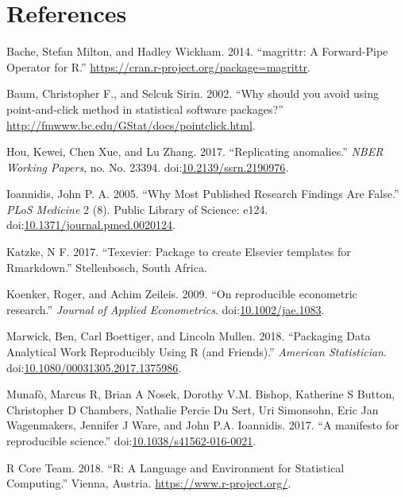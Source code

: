 \documentclass[11pt,preprint, authoryear]{elsarticle}
\numberwithin{equation}{section}
\numberwithin{figure}{section}
\numberwithin{table}{section}
\begin{document}
\section*{References}\label{references}

\hypertarget{refs}{}
\hypertarget{ref-Bache2014}{}
Bache, Stefan Milton, and Hadley Wickham. 2014. ``magrittr: A
Forward-Pipe Operator for R.''
\url{https://cran.r-project.org/package=magrittr}.

\hypertarget{ref-Baum2002}{}
Baum, Christopher F., and Selcuk Sirin. 2002. ``Why should you avoid
using point-and-click method in statistical software packages?''
\url{http://fmwww.bc.edu/GStat/docs/pointclick.html}.

\hypertarget{ref-Hou2017}{}
Hou, Kewei, Chen Xue, and Lu Zhang. 2017. ``Replicating anomalies.''
\emph{NBER Working Papers}, no. No. 23394.
doi:\href{https://doi.org/10.2139/ssrn.2190976}{10.2139/ssrn.2190976}.

\hypertarget{ref-Ioannidis2005}{}
Ioannidis, John P. A. 2005. ``Why Most Published Research Findings Are
False.'' \emph{PLoS Medicine} 2 (8). Public Library of Science: e124.
doi:\href{https://doi.org/10.1371/journal.pmed.0020124}{10.1371/journal.pmed.0020124}.

\hypertarget{ref-Katzke2017}{}
Katzke, N F. 2017. ``Texevier: Package to create Elsevier templates for
Rmarkdown.'' Stellenbosch, South Africa.

\hypertarget{ref-Koenker2009}{}
Koenker, Roger, and Achim Zeileis. 2009. ``On reproducible econometric
research.'' \emph{Journal of Applied Econometrics}.
doi:\href{https://doi.org/10.1002/jae.1083}{10.1002/jae.1083}.

\hypertarget{ref-Marwick2018}{}
Marwick, Ben, Carl Boettiger, and Lincoln Mullen. 2018. ``Packaging Data
Analytical Work Reproducibly Using R (and Friends).'' \emph{American
Statistician}.
doi:\href{https://doi.org/10.1080/00031305.2017.1375986}{10.1080/00031305.2017.1375986}.

\hypertarget{ref-Munafo2017}{}
Munafò, Marcus R, Brian A Nosek, Dorothy V.M. Bishop, Katherine S
Button, Christopher D Chambers, Nathalie Percie Du Sert, Uri Simonsohn,
Eric Jan Wagenmakers, Jennifer J Ware, and John P.A. Ioannidis. 2017.
``A manifesto for reproducible science.''
doi:\href{https://doi.org/10.1038/s41562-016-0021}{10.1038/s41562-016-0021}.

\hypertarget{ref-RCoreTeam2018}{}
R Core Team. 2018. ``R: A Language and Environment for Statistical
Computing.'' Vienna, Austria. \url{https://www.r-project.org/}.
\end{document}
